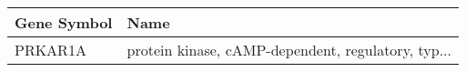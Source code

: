 \begin{tabular}{ll}
\toprule
Gene Symbol &                                               Name \\
\midrule
    PRKAR1A & protein kinase, cAMP-dependent, regulatory, typ... \\
\bottomrule
\end{tabular}
